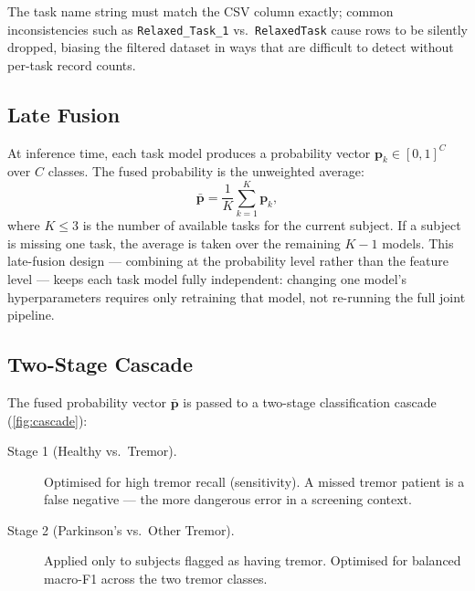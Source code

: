 \documentclass[12pt, a4paper]{article}
\begin{document}
\noindent
The task name string must match the CSV column exactly; common
inconsistencies such as \texttt{Relaxed\_Task\_1} vs.\
\texttt{RelaxedTask} cause rows to be silently dropped, biasing the
filtered dataset in ways that are difficult to detect without
per-task record counts.

\subsection{Late Fusion}

At inference time, each task model produces a probability vector
$\mathbf{p}_k \in [0,1]^C$ over $C$ classes. The fused probability
is the unweighted average:
\begin{equation}
  \bar{\mathbf{p}} = \frac{1}{K} \sum_{k=1}^{K} \mathbf{p}_k,
  \label{eq:fusion}
\end{equation}
where $K \leq 3$ is the number of available tasks for the current
subject. If a subject is missing one task, the average is taken over
the remaining $K-1$ models. This late-fusion design — combining at the
probability level rather than the feature level — keeps each task
model fully independent: changing one model's hyperparameters requires
only retraining that model, not re-running the full joint pipeline.

\subsection{Two-Stage Cascade}

The fused probability vector $\bar{\mathbf{p}}$ is passed to a
two-stage classification cascade (\cref{fig:cascade}):

\begin{description}
  \item[Stage 1 (Healthy vs.\ Tremor).] Optimised for high tremor
    recall (sensitivity). A missed tremor patient is a false negative
    — the more dangerous error in a screening context.
  \item[Stage 2 (Parkinson's vs.\ Other Tremor).] Applied only to
    subjects flagged as having tremor. Optimised for balanced macro-F1
    across the two tremor classes.
\end{description}
\end{document}
